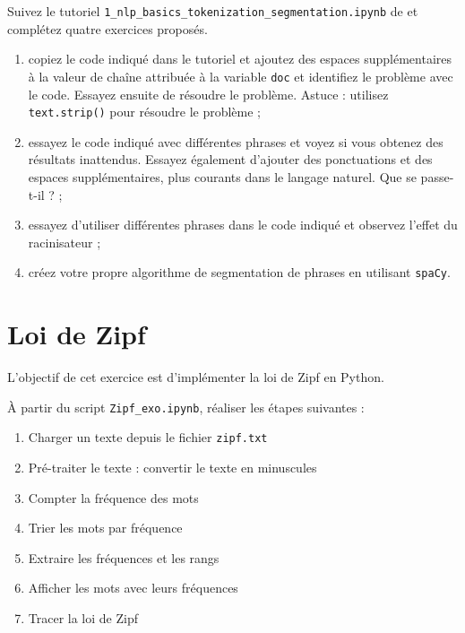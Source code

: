\documentclass[xcolor={table,usenames,dvipsnames}]{article}
\begin{document}
	Suivez le tutoriel \texttt{1\_nlp\_basics\_tokenization\_segmentation.ipynb} de \textcite{saravia} et complétez quatre exercices proposés.
	\begin{enumerate}
		\item copiez le code indiqué dans le tutoriel et ajoutez des espaces supplémentaires à la valeur de chaîne attribuée à la variable \texttt{doc} et identifiez le problème avec le code. Essayez ensuite de résoudre le problème. Astuce : utilisez \texttt{text.strip()} pour résoudre le problème ;
		\item essayez le code indiqué avec différentes phrases et voyez si vous obtenez des résultats inattendus. Essayez également d'ajouter des ponctuations et des espaces supplémentaires, plus courants dans le langage naturel. Que se passe-t-il ? ;
		\item essayez d'utiliser différentes phrases dans le code indiqué et observez l'effet du racinisateur ;
		\item créez votre propre algorithme de segmentation de phrases en utilisant \texttt{spaCy}.
	\end{enumerate}
	
	\section{Loi de Zipf}  %
	
	L'objectif de cet exercice est d'implémenter la loi de Zipf en Python.
	
	\bigskip
	
	À partir du script \texttt{Zipf\_exo.ipynb}, réaliser les étapes suivantes :
	\begin{enumerate}
		\item Charger un texte depuis le fichier \texttt{zipf.txt}
		\item Pré-traiter le texte : convertir le texte en minuscules
		\item Compter la fréquence des mots
		\item Trier les mots par fréquence
		\item Extraire les fréquences et les rangs
		\item  Afficher les mots avec leurs fréquences
		\item Tracer la loi de Zipf
	\end{enumerate}
	

	

		\printbibliography

	
\end{document}

